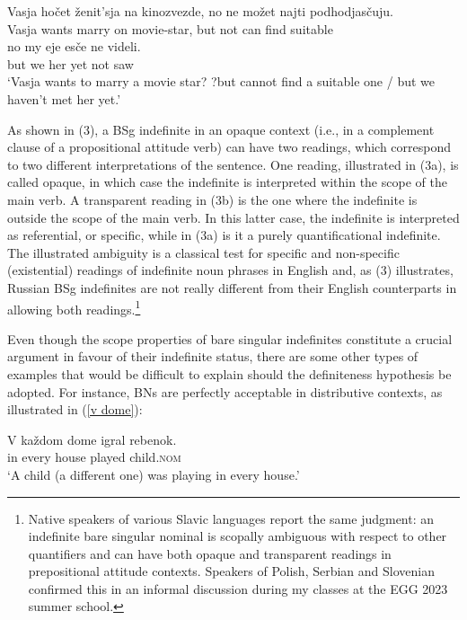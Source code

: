 \documentclass[output=paper,colorlinks,citecolor=brown]{langscibook}
\begin{document}
\ea
\ea \gll Vasja 	ho\v{c}et	 	\v{z}enit'sja 	na 	kinozvezde, no 	ne 	mo\v{z}et 	najti 	podhodjas\v{c}uju.\\
 Vasja		wants 	marry		on		movie-star, but 	not 	can 	find 	suitable\\
\ex \gll no 	my 	eje 	es\v{c}e 	ne 	videli.\\
but 	we 	her 	yet 		not 	saw \\
\glt `Vasja wants to marry a movie star? ?but cannot find a suitable one / but we haven't met her yet.'
\z\z
 
As shown in (3), a BSg indefinite in an opaque context (i.e., in a complement clause of a propositional attitude verb) can have two readings, which correspond to two different interpretations of the sentence. One reading, illustrated in (3a), is called opaque, in which case the indefinite is interpreted within the scope of the main verb. A transparent reading in (3b) is the one where the indefinite is outside the scope of the main verb. In this latter case, the indefinite is interpreted as referential, or specific, while in (3a) is it a purely quantificational indefinite. The illustrated ambiguity is a classical test for specific and non-specific (existential) readings of indefinite noun phrases in English and, as (3) illustrates, Russian BSg indefinites are not really different from their English counterparts in allowing both readings.\footnote{Native speakers of various Slavic languages report the same judgment: an indefinite bare singular nominal is scopally ambiguous with respect to other quantifiers and can have both opaque and transparent readings in prepositional attitude contexts. Speakers of Polish, Serbian and Slovenian confirmed this in an informal discussion during my classes at the EGG 2023 summer school.} 
\fi

Even though the scope properties of bare singular indefinites constitute a crucial argument in favour of their indefinite status, there are some other types of examples that would be difficult to explain should the definiteness hypothesis be adopted. For instance, BNs are perfectly acceptable in distributive contexts, as illustrated in (\ref{v dome}):

\ea \label{v dome} \gll  
V ka\v{z}dom  dome 	igral 	rebenok.  \\ 
in every  house	played	child.\textsc{nom} \\
\glt `A child (a different one) was playing in every house.'
\z
\end{document}
